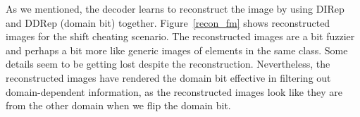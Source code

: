 \documentclass{article}
\begin{document}

As we mentioned, the decoder learns to reconstruct the image by using DIRep and DDRep (domain bit) together. %
Figure~\ref{recon_fm}  shows reconstructed images for the shift cheating scenario. The reconstructed images are a bit fuzzier and perhaps a bit more like generic images of elements in the same class. Some details seem to be getting lost
despite the reconstruction. Nevertheless, the reconstructed images have rendered the domain bit effective in filtering out domain-dependent information, as the reconstructed images look like they are from the other domain when we flip the domain bit. 
\end{document}

